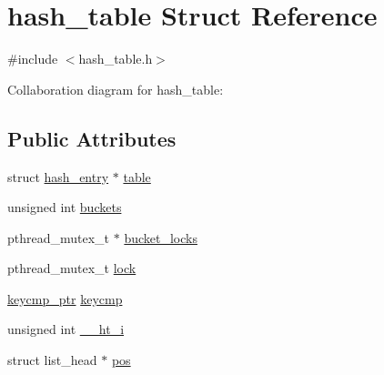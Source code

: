 \hypertarget{structhash__table}{\section{hash\-\_\-table Struct Reference}
\label{structhash__table}
}


{\ttfamily \#include $<$hash\-\_\-table.\-h$>$}



Collaboration diagram for hash\-\_\-table\-:
\subsection*{Public Attributes}
\begin{DoxyCompactItemize}
\item 
struct \hyperlink{structhash__entry}{hash\-\_\-entry} $\ast$ \hyperlink{structhash__table_a8d603d6d232203d2e491b58c9c6dabc5}{table}
\item 
unsigned int \hyperlink{structhash__table_a4678419b52c36e8b949b17eb4843a420}{buckets}
\item 
pthread\-\_\-mutex\-\_\-t $\ast$ \hyperlink{structhash__table_a75f86a63f6a0efb451750126133cdddc}{bucket\-\_\-locks}
\item 
pthread\-\_\-mutex\-\_\-t \hyperlink{structhash__table_af4cefababf047c699eca5f45f8d4284e}{lock}
\item 
\hyperlink{hash__table_8h_a3d5ec14056d7480c722de378cf762198}{keycmp\-\_\-ptr} \hyperlink{structhash__table_a9465a319f391f0a50a4a84362c40fe48}{keycmp}
\item 
unsigned int \hyperlink{structhash__table_a77da69e21124ac1097627ae23ae72ef5}{\-\_\-\-\_\-ht\-\_\-i}
\item 
struct list\-\_\-head $\ast$ \hyperlink{structhash__table_af971de29e1c0b18ae5dede92ac65645d}{pos}
\end{DoxyCompactItemize}


